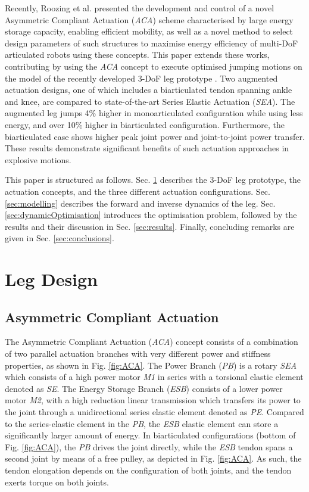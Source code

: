 \documentclass[letterpaper, 10 pt, conference]{ieeeconf}  %
\begin{document}
Recently, Roozing et al. \cite{roozing2016development, roozing2016design, roozing_design_2018} presented the development and control of a novel Asymmetric Compliant Actuation (\textit{ACA}) scheme characterised by large energy storage capacity, enabling efficient mobility, as well as a novel method to select design parameters of such structures to maximise energy efficiency of multi-DoF articulated robots using these concepts. This paper extends these works, contributing by using the \textit{ACA} concept to execute optimised jumping motions on the model of the recently developed 3-DoF leg prototype \cite{roozing_design_2018}. Two augmented actuation designs, one of which includes a biarticulated tendon spanning ankle and knee, are compared to state-of-the-art Series Elastic Actuation (\textit{SEA}). The augmented leg jumps 4\% higher in monoarticulated configuration while using less energy, and over 10\% higher in biarticulated configuration. Furthermore, the biarticulated case shows higher peak joint power and joint-to-joint power transfer. These results demonstrate significant benefits of such actuation approaches in explosive motions.

This paper is structured as follows. Sec. \ref{sec:legDesign} describes the 3-DoF leg prototype, the actuation concepts, and the three different actuation configurations. Sec. \ref{sec:modelling} describes the forward and inverse dynamics of the leg. Sec. \ref{sec:dynamicOptimisation} introduces the optimisation problem, followed by the results and their discussion in Sec. \ref{sec:results}. Finally, concluding remarks are given in Sec. \ref{sec:conclusions}.


\section{Leg Design}
\label{sec:legDesign}

\subsection{Asymmetric Compliant Actuation}
\label{subsec:ACA}
The Asymmetric Compliant Actuation (\textit{ACA}) concept consists of a combination of two parallel actuation branches with very different power and stiffness properties, as shown in Fig. \ref{fig:ACA}. The Power Branch (\textit{PB}) is a rotary \textit{SEA} which consists of a high power motor \textit{M1} in series with a torsional elastic element denoted as \textit{SE}. The Energy Storage Branch (\textit{ESB}) consists of a lower power motor \textit{M2}, with a high reduction linear transmission which transfers its power to the joint through a unidirectional series elastic element denoted as \textit{PE}. Compared to the series-elastic element in the \textit{PB}, the \textit{ESB} elastic element can store a significantly larger amount of energy. In biarticulated configurations (bottom of Fig. \ref{fig:ACA}), the \textit{PB} drives the joint directly, while the \textit{ESB} tendon spans a second joint by means of a free pulley, as depicted in Fig. \ref{fig:ACA}. As such, the tendon elongation depends on the configuration of both joints, and the tendon exerts torque on both joints.
\end{document}
